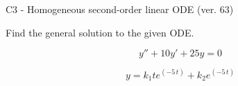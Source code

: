 \begin{exercise}
  \begin{exerciseTitle}C3 - Homogeneous second-order linear ODE (ver. 63)\end{exerciseTitle}
  \begin{exerciseStatement}
    
Find the general solution to the given ODE.

    
\[y''+10y'+25y = 0\]

  \end{exerciseStatement}
  \begin{exerciseAnswer}
    
\[y= k_{1} t e^{\left(-5 \, t\right)} + k_{2} e^{\left(-5 \, t\right)}\]

  \end{exerciseAnswer}
\end{exercise}